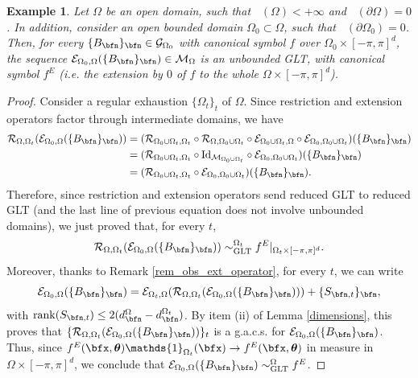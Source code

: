 \documentclass{amsart}
\newtheorem{exmp}[thm]{Example}
\DeclareMathOperator{\Ld}{\mathcal{L}^d}
\newcommand{\bftheta}{{\boldsymbol\theta}}
\begin{document}
\begin{exmp}\label{example_UGLT}
    Let $\Omega$ be an open domain, such that $\Ld(\Omega)<+\infty$ and $\Ld(\partial\Omega)=0$. In addition, consider an open bounded domain $\Omega_0\subset\Omega$, such that $\Ld(\partial\Omega_0)=0$. Then, for every $\{B_\bfn\}_\bfn\in\mathcal{G}_{\Omega_0}$ with canonical symbol $f$ over $\Omega_0 \times [-\pi,\pi]^d$, the sequence $\mathcal{E}_{\Omega_0,\Omega}(\{B_\bfn\}_\bfn)\in\mathcal{M}_\Omega$ is an unbounded GLT, with canonical symbol $f^E$ (i.e. the extension by $0$ of $f$ to the whole $\Omega \times [-\pi,\pi]^d$).
\end{exmp}
\begin{proof}
    Consider a regular exhaustion $\{\Omega_t\}_t$ of $\Omega$. Since restriction and extension operators factor through intermediate domains, we have 
    \begin{align*}
        \mathcal{R}_{\Omega,\Omega_t}(\mathcal{E}_{\Omega_0,\Omega}(\{B_\bfn\}_\bfn))&=(\mathcal{R}_{\Omega_0\cup\Omega_t,\Omega_t}\circ\mathcal{R}_{\Omega,\Omega_0\cup\Omega_t}\circ\mathcal{E}_{\Omega_0\cup\Omega_t,\Omega}\circ\mathcal{E}_{\Omega_0,\Omega_0\cup\Omega_t})(\{B_\bfn\}_\bfn)\\
        &=(\mathcal{R}_{\Omega_0\cup\Omega_t,\Omega_t}\circ\mathrm{Id}_{\mathcal{M}_{\Omega_0\cup\Omega_t}}\circ\mathcal{E}_{\Omega_0,\Omega_0\cup\Omega_t})(\{B_\bfn\}_\bfn)\\
        &=(\mathcal{R}_{\Omega_0\cup\Omega_t,\Omega_t}\circ\mathcal{E}_{\Omega_0,\Omega_0\cup\Omega_t})(\{B_\bfn\}_\bfn).
    \end{align*}
    Therefore, since restriction and extension operators send reduced GLT to reduced GLT (and the last line of previous equation does not involve unbounded domains), we just proved that, for every $t$,
    \begin{equation*}
        \mathcal{R}_{\Omega,\Omega_t}(\mathcal{E}_{\Omega_0,\Omega}(\{B_\bfn\}_\bfn))\sim_{\mathrm{GLT}}^{\Omega_t}f^E|_{\Omega_t\times[-\pi,\pi]^d}.
    \end{equation*}
    Moreover, thanks to Remark \ref{rem_obs_ext_operator}, for every $t$, we can write
    \begin{equation*}
        \mathcal{E}_{\Omega_0,\Omega}(\{B_\bfn\}_\bfn)=\mathcal{E}_{\Omega_t,\Omega}(\mathcal{R}_{\Omega,\Omega_t}(\mathcal{E}_{\Omega_0,\Omega}(\{B_\bfn\}_\bfn)))+\{S_{\bfn,t}\}_\bfn,
    \end{equation*}
    with $\mathrm{rank}(S_{\bfn,t})\leq 2(d_\bfn^{\Omega}-d_\bfn^{\Omega_t})$. By item (ii) of Lemma \ref{dimensions}, this proves that $\{\mathcal{R}_{\Omega,\Omega_t}(\mathcal{E}_{\Omega_0,\Omega}(\{B_\bfn\}_\bfn))\}_t$ is a g.a.c.s. for $\mathcal{E}_{\Omega_0,\Omega}(\{B_\bfn\}_\bfn)$. Thus, since $f^E(\bfx,\bftheta)\mathds{1}_{\Omega_t}(\bfx)\to f^E(\bfx,\bftheta)$ in measure in $\Omega \times [-\pi,\pi]^d$, we conclude that $\mathcal{E}_{\Omega_0,\Omega}(\{B_\bfn\}_\bfn)\sim_{\mathrm{GLT}}^{\Omega}f^E$.
 \end{proof}
\end{document}
